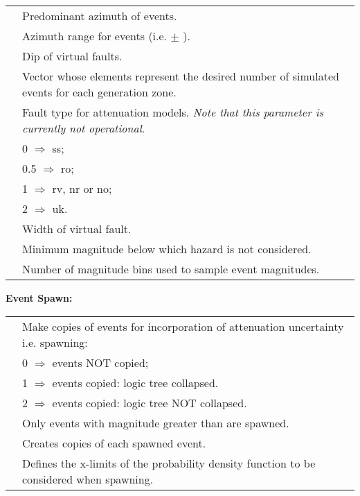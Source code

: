 \begin{supertabular}{lp{0.6\textwidth}}
 &     Predominant azimuth of events.  \\
   &   Azimuth range for events (i.e.  $\pm$ ).   \\
 &    Dip of virtual faults.    \\
  &  Vector whose elements represent the desired number of simulated events for each generation zone.   \\
   &  Fault type for attenuation models.
\textit{Note that this parameter is currently not operational}.
 \\
 & \hspace{0.5em} 0 $\Rightarrow$ ss; \\
 & \hspace{0.5em} 0.5 $\Rightarrow$ ro; \\
 & \hspace{0.5em} 1 $\Rightarrow$ rv, nr or no; \\
 & \hspace{0.5em} 2 $\Rightarrow$ uk. \\
    &  Width of virtual fault.      \\
  &  Minimum magnitude below which hazard is not considered.     \\
   &   Number of magnitude bins used to sample
event magnitudes.    \\
 \end{supertabular}


\vspace{2em} \textbf{Event Spawn:}

\begin{supertabular}{lp{0.6\textwidth}}
  &   Make copies of events for
incorporation of attenuation uncertainty  i.e. spawning: \\
& \hspace{0.5em} 0 $\Rightarrow$ events NOT copied; \\
& \hspace{0.5em} 1 $\Rightarrow$ events copied: logic tree collapsed.  \\
& \hspace{0.5em} 2 $\Rightarrow$ events copied: logic tree NOT collapsed.  \\
 &  Only events with magnitude greater than  are spawned. \\
 & Creates  copies of each spawned event. \\
 &  Defines the x-limits of the probability density function to be considered when spawning.\\
 \end{supertabular}


